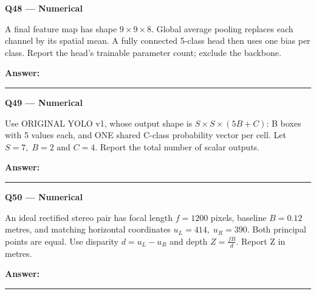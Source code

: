 \documentclass[11pt,a4paper]{article}
\begin{document}
\par\vspace{12pt}
\begin{minipage}{\linewidth}
\textbf{Q48 — Numerical}\par\smallskip
A final feature map has shape \(9\times9\times8\). Global average pooling replaces each channel by its spatial mean. A fully connected 5-class head then uses one bias per class. Report the head's trainable parameter count; exclude the backbone.
\par\medskip\textbf{Answer:} \rule{55mm}{0.4pt}
\end{minipage}
\par\vspace{12pt}
\begin{minipage}{\linewidth}
\textbf{Q49 — Numerical}\par\smallskip
Use ORIGINAL YOLO v1,\allowbreak{} whose output shape is \(S\times S\times(5B+C)\): B boxes with 5 values each,\allowbreak{} and ONE shared C-class probability vector per cell. Let \(S=7,\;B=2\text{ and }C=4\). Report the total number of scalar outputs.
\par\medskip\textbf{Answer:} \rule{55mm}{0.4pt}
\end{minipage}
\par\vspace{12pt}
\begin{minipage}{\linewidth}
\textbf{Q50 — Numerical}\par\smallskip
An ideal rectified stereo pair has focal length \(f=1200\) pixels,\allowbreak{} baseline \(B=0.12\) metres,\allowbreak{} and matching horizontal coordinates \(u_L=414,\;u_R=390\). Both principal points are equal. Use disparity \(d=u_L-u_R\) and depth \(Z=\frac{fB}{d}\). Report Z in metres.
\par\medskip\textbf{Answer:} \rule{55mm}{0.4pt}
\end{minipage}
\par\vspace{12pt}
\end{document}
